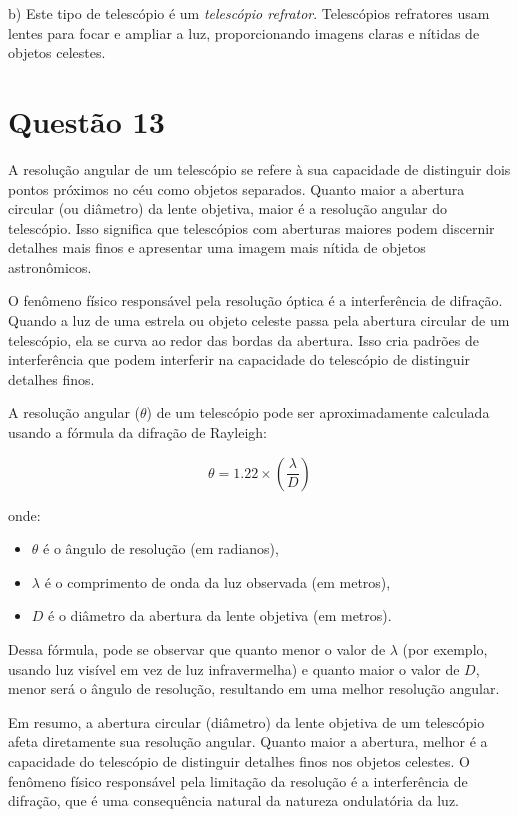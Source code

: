 \documentclass[a4paper, 12pt]{article}
\begin{document}
b) Este tipo de telescópio é um \textit{telescópio refrator}. Telescópios refratores usam lentes para focar e ampliar a luz, proporcionando imagens claras e nítidas de objetos celestes.
\section*{Questão 13}

A resolução angular de um telescópio se refere à sua capacidade de distinguir dois pontos próximos no céu como objetos separados. Quanto maior a abertura circular (ou diâmetro) da lente objetiva, maior é a resolução angular do telescópio. Isso significa que telescópios com aberturas maiores podem discernir detalhes mais finos e apresentar uma imagem mais nítida de objetos astronômicos.

O fenômeno físico responsável pela resolução óptica é a interferência de difração. Quando a luz de uma estrela ou objeto celeste passa pela abertura circular de um telescópio, ela se curva ao redor das bordas da abertura. Isso cria padrões de interferência que podem interferir na capacidade do telescópio de distinguir detalhes finos.

A resolução angular (\(\theta\)) de um telescópio pode ser aproximadamente calculada usando a fórmula da difração de Rayleigh:

\[
\theta = 1.22 \times \left( \frac{\lambda}{D} \right)
\]

onde:
\begin{itemize}
    \item \( \theta \) é o ângulo de resolução (em radianos),
    \item \( \lambda \) é o comprimento de onda da luz observada (em metros),
    \item \( D \) é o diâmetro da abertura da lente objetiva (em metros).
\end{itemize}

Dessa fórmula, pode se observar que quanto menor o valor de \( \lambda \) (por exemplo, usando luz visível em vez de luz infravermelha) e quanto maior o valor de \( D \), menor será o ângulo de resolução, resultando em uma melhor resolução angular.

Em resumo, a abertura circular (diâmetro) da lente objetiva de um telescópio afeta diretamente sua resolução angular. Quanto maior a abertura, melhor é a capacidade do telescópio de distinguir detalhes finos nos objetos celestes. O fenômeno físico responsável pela limitação da resolução é a interferência de difração, que é uma consequência natural da natureza ondulatória da luz.
\end{document}
